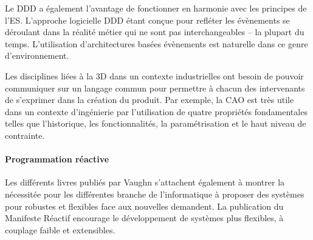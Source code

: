 	Le \gls{DDD} a également l'avantage de fonctionner en harmonie avec les 
	principes de l'\gls{ES}. L'approche logicielle \gls{DDD} étant conçue pour refléter 
	les évènements se déroulant dans la réalité métier qui ne sont pas 
	interchangeables -- la plupart du temps. L'utilisation d'architectures 
	basées évènements est naturelle dans ce genre d'environnement. 
	
	Les disciplines liées à la 3D dans un contexte industrielles ont besoin de 
	pouvoir 
	communiquer sur un langage commun pour permettre à chacun des 
	intervenants 
	de s'exprimer dans la création du produit. Par exemple, la \gls{CAO} est très 
	utile 
	dans un contexte d'ingénierie par l'utilisation de quatre propriétés fondamentales 
	telles que l'historique, les fonctionnalités, la paramétrisation et le haut niveau de 
	contrainte.
	
	\paragraph{Programmation réactive}
	Les différents livres publiés par Vaughn s'attachent également à montrer la 
	nécessitée pour les différentes branche de l'informatique à proposer des 
	systèmes 
	pour robustes et flexibles face aux nouvelles demandent. La publication du 
	Manifeste Réactif encourage le développement de systèmes \og plus flexibles, 
	à 
	couplage faible et extensibles\fg{}.
	
